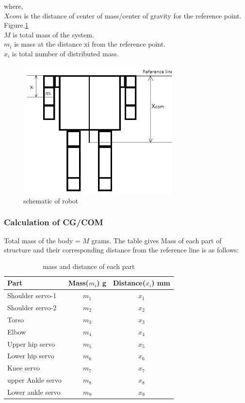 \documentclass[12pt]{article}
\begin{document}
where,\\
$Xcom$ is the distance of center of mass/center of gravity for the reference point. Figure.\ref{fig:Sch_bot} \\
$M$ is total mass of the system.\\
$m_{i}$ is mass at the distance xi from the reference point.\\
$x_{i}$ is total number of distributed mass.
\newpage
\begin{figure}[h]
	\centering
	\includegraphics[width=0.4\linewidth, height=7cm]{Sch_bot.jpg} 
	\caption{schematic of robot}
	\label{fig:Sch_bot}
\end{figure}
\subsubsection{Calculation of CG/COM}
Total mass of the body = $M$ grams.
The table gives Mass of each part of structure and their corresponding distance from the
reference line is as follows:\\

\begin{table}[h!]
\centering
	\begin{tabular}{ |l|c|c| } 
		\hline
		Part & Mass($m_{i}$) g & Distance($x_{i}$) mm \\
			\hline
				Shoulder servo-1 & $m_{1}$ & $x_{1}$ \\
				
				Shoulder servo-2 & $m_{2}$ & $x_{2}$ \\
				Torso & $m_{3}$ & $x_{3}$ \\
				Elbow & $m_{4}$ & $x_{4}$ \\
				Upper hip servo & $m_{5}$ & $x_{5}$ \\
				Lower hip servo & $m_{6}$ & $x_{6}$ \\
				Knee servo & $m_{7}$ & $x_{7}$ \\
				upper Ankle servo & $m_{8}$ & $x_{8}$ \\
				Lower ankle servo & $m_{9}$ & $x_{9}$ \\
		\hline
	
		
	\end{tabular}
	\caption{mass and distance of each part}
	\label{tab1:COM}
\end{table}
\end{document}
